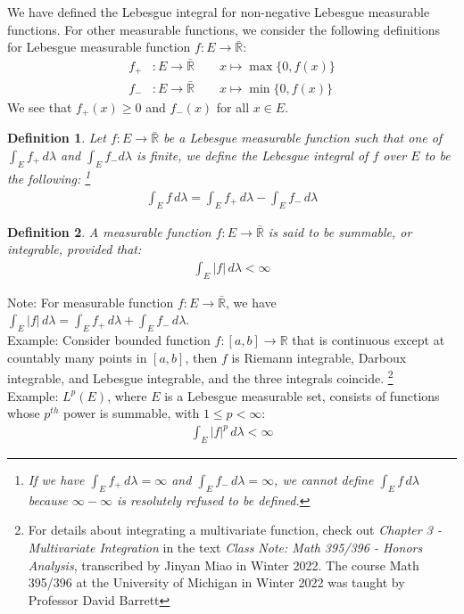 \documentclass[11pt]{book}
\theoremstyle{break}
\theoremstyle{break}
\newtheorem{defn}{Definition}[corL]
\newcommand{\R}{\mathbb{R}}
\newcommand{\note}{\color{red}Note: \color{black}}
\newcommand{\example}{\color{green}Example: \color{black}}
\begin{document}
We have defined the Lebesgue integral for non-negative Lebesgue measurable functions. For other measurable functions, we consider the following definitions for Lebesgue measurable function $f:E \to \bar{\R}$:
\begin{align*}
f_+&:E \to \bar{\R}\qquad x\mapsto \max\{0,f(x)\} \\
f_-&:E \to \bar{\R}\qquad x\mapsto \min\{0,f(x)\} 
\end{align*}
We see that $f_+(x)\geq 0$ and $f_-(x)$ for all $x \in E$. 

\begin{defn}
Let $f:E \to \bar{\R}$ be a Lebesgue measurable function such that one of $\int_E f_+ \, d\lambda$ and $\int_E f_- d\lambda$ is finite, we define the Lebesgue integral of $f$ over $E$ to be the following: 
\footnote{If we have $\int_E f_+\, d\lambda = \infty $ and $\int_E f_- \, d\lambda = \infty$, we cannot define $\int_E f\, d\lambda$ because $\infty - \infty$ is resolutely refused to be defined.}
\begin{align*}
\int_E f\,d\lambda = \int_E f_+\,d\lambda - \int_E f_-\, d\lambda
\end{align*}
\end{defn}

\begin{defn}
A measurable function $f:E \to \bar{\R}$ is said to be summable, or integrable, provided that:
\begin{align*}
\int_E |f| \, d\lambda < \infty
\end{align*}
\end{defn}

\note For measurable function $f:E \to \bar{\R}$, we have $\int_E |f| \, d\lambda = \int_E f_+ \, d\lambda + \int_E f_- \, d\lambda$.\\

\example Consider bounded function $f:[a,b]\to \R$ that is continuous except at countably many points in $[a,b]$, then $f$ is Riemann integrable, Darboux integrable, and Lebesgue integrable, and the three integrals coincide. \footnote{For details about integrating a multivariate function, check out \textit{Chapter 3 - Multivariate Integration} in the text \textit{Class Note: Math 395/396 - Honors Analysis}, transcribed by Jinyan Miao in Winter 2022.
The course Math 395/396 at the University of Michigan in Winter 2022 was taught by
Professor David Barrett}\\

\example $L^p(E)$, where $E$ is a Lebesgue measurable set, consists of functions whose $p^{th}$ power is summable, with $1\leq p <\infty$: 
\begin{align*}
\int_E |f|^p \, d\lambda < \infty
\end{align*}
\end{document}
